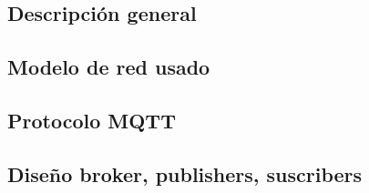 \documentclass[a4paper,10pt]{article}
\begin{document}
\subsection{Descripción general}\label{descripciuxf3n-general}

\subsection{Modelo de red usado}\label{modelo-de-red-usado}

\subsection{Protocolo MQTT}\label{protocolo-mqtt}

\subsection{Diseño broker, publishers,
suscribers}\label{diseuxf1o-broker-publishers-suscribers}



\newpage

\cite{IECWorldPlugs}




 
\end{document}
